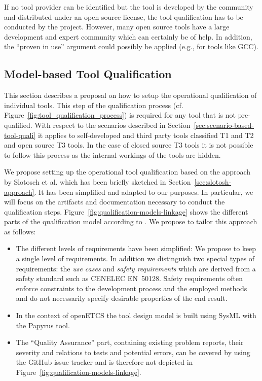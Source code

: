 If no tool provider can be identified but the tool is developed by the community and distributed under an open source license, the tool qualification has to be conducted by the project. However, many open source tools have a large development and expert community which can certainly be of help. In addition, the ``proven in use'' argument could possibly be applied (e.g., for tools like GCC).

\subsection{Model-based Tool Qualification}
\label{sec:model-based-tool-quali}

This section describes a proposal on how to setup the operational qualification of individual tools. This step of the qualification process (cf. Figure~\ref{fig:tool_qualification_process}) is required for any tool that is not pre-qualified. With respect to the scenarios described in Section~\ref{sec:scenario-based-tool-quali} it applies to self-developed and third party tools classified T1 and T2 and open source T3 tools. In the case of closed source T3 tools it is not possible to follow this process as the internal workings of the tools are hidden.

We propose setting up the operational tool qualification based on the approach by Slotosch et al. which has been briefly sketched in Section~\ref{sec:slotosh-approach}. It has been simplified and adapted to our purposes. In particular, we will focus on the artifacts and documentation necessary to conduct the qualification steps. Figure~\ref{fig:qualification-models-linkage} shows the different parts of the qualification model according to \cite{slotosch_model-based_2012}. We propose to tailor this approach as follows:
\begin{itemize}
    \item The different levels of requirements have been simplified: We propose to keep a single level of requirements. In addition we distinguish two special types of requirements: the \emph{use cases} and \emph{safety requirements} which are derived from a safety standard such as CENELEC EN~50128. Safety requirements often enforce constraints to the development process and the employed methods and do not necessarily specify desirable properties of the end result.
    \item In the context of openETCS the tool design model is built using SysML with the Papyrus tool. 
	\item The ``Quality Assurance'' part, containing existing problem reports, their severity and relations to tests and potential errors, can be covered by using the GitHub issue tracker and is therefore not depicted in Figure~\ref{fig:qualification-models-linkage}.
\end{itemize}

